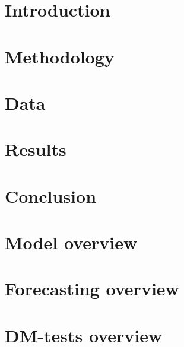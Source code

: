 \documentclass[a4paper,11pt]{report}
\begin{document}


\onehalfspacing

\tableofcontents
\newpage

\chapter{Introduction}
\label{chap:introduction}


\chapter{Methodology}
\label{chap:methodology}


\chapter{Data}
\label{chap:data}


\chapter{Results}
\label{chap:results}


\chapter{Conclusion}
\label{chap:conclusion}


\appendix
\chapter{Model overview}
\label{chap:model-overview}


\chapter{Forecasting overview}
\label{chap:forecasting-overview}


\chapter{DM-tests overview}
\label{chap:dmtest-overview}


\printbibliography
\end{document}
